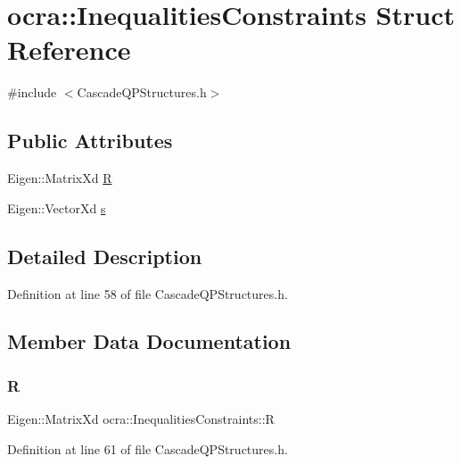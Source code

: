 \hypertarget{structocra_1_1InequalitiesConstraints}{}\section{ocra\+:\+:Inequalities\+Constraints Struct Reference}
\label{structocra_1_1InequalitiesConstraints}


{\ttfamily \#include $<$Cascade\+Q\+P\+Structures.\+h$>$}

\subsection*{Public Attributes}
\begin{DoxyCompactItemize}
\item 
Eigen\+::\+Matrix\+Xd \hyperlink{structocra_1_1InequalitiesConstraints_a855a07da37932011602005e3af25aa76}{R}
\item 
Eigen\+::\+Vector\+Xd \hyperlink{structocra_1_1InequalitiesConstraints_a26db4bbe606a537c1dedbc30a2ca8f36}{s}
\end{DoxyCompactItemize}


\subsection{Detailed Description}


Definition at line 58 of file Cascade\+Q\+P\+Structures.\+h.



\subsection{Member Data Documentation}
\hypertarget{structocra_1_1InequalitiesConstraints_a855a07da37932011602005e3af25aa76}{}\label{structocra_1_1InequalitiesConstraints_a855a07da37932011602005e3af25aa76} 
\subsubsection{\texorpdfstring{R}{R}}
{\footnotesize\ttfamily Eigen\+::\+Matrix\+Xd ocra\+::\+Inequalities\+Constraints\+::R}



Definition at line 61 of file Cascade\+Q\+P\+Structures.\+h.


